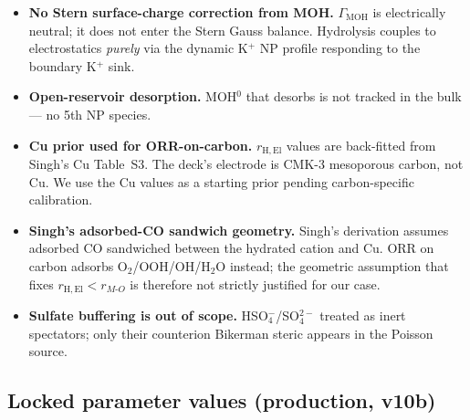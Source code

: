 \documentclass[11pt]{article}
\begin{document}
\begin{itemize}[leftmargin=*,nosep]
\item \textbf{No Stern surface-charge correction from MOH.}  $\Gamma_{\mathrm{MOH}}$
  is electrically neutral; it does not enter the Stern Gauss balance.
  Hydrolysis couples to electrostatics \emph{purely} via the dynamic
  K$^+$ NP profile responding to the boundary K$^+$ sink.
\item \textbf{Open-reservoir desorption.}  MOH$^0$ that desorbs is not
  tracked in the bulk --- no 5th NP species.
\item \textbf{Cu prior used for ORR-on-carbon.}  $r_{\mathrm{H,El}}$
  values are back-fitted from Singh's Cu Table~S3.  The deck's
  electrode is CMK-3 mesoporous carbon, not Cu.  We use the Cu
  values as a starting prior pending carbon-specific calibration.
\item \textbf{Singh's adsorbed-CO sandwich geometry.}  Singh's
  derivation assumes adsorbed CO sandwiched between the hydrated
  cation and Cu.  ORR on carbon adsorbs O$_2$/OOH/OH/H$_2$O instead;
  the geometric assumption that fixes $r_{\mathrm{H,El}}<r_{M\text{-}O}$
  is therefore not strictly justified for our case.
\item \textbf{Sulfate buffering is out of scope.}  HSO$_4^-$/SO$_4^{2-}$
  treated as inert spectators; only their counterion Bikerman steric
  appears in the Poisson source.
\end{itemize}

\subsection{Locked parameter values (production, v10b)}
\end{document}
